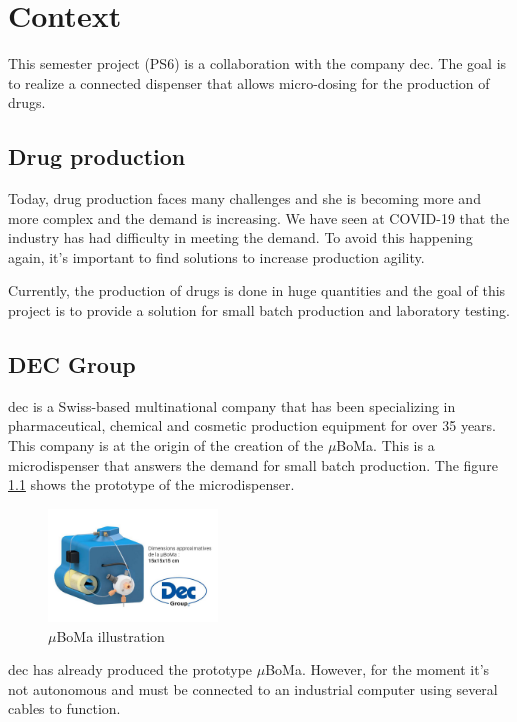 \chapter{Context}
\label{chap:contexte}

This semester project (PS6) is a collaboration with the company \acrfull{dec}.
The goal is to realize a connected dispenser that allows micro-dosing for the production of drugs.


\section{Drug production}
\label{sec:context:production}

Today, drug production faces many challenges and she is becoming more and more complex and the demand is increasing.
We have seen at COVID-19 that the industry has had difficulty in meeting the demand.
To avoid this happening again, it's important to find solutions to increase production agility.

Currently, the production of drugs is done in huge quantities and the goal of this project is to provide a solution for small batch production and laboratory testing.


\section{DEC Group}
\label{sec:context:dec}

\acrfull{dec} is a Swiss-based multinational company that has been specializing in pharmaceutical, chemical and cosmetic production equipment for over 35 years.
This company is at the origin of the creation of the $\mu$BoMa.
This is a microdispenser that answers the demand for small batch production.
The figure \ref{fig:dec} shows the prototype of the microdispenser.

\begin{figure}[ht]
    \centering
    \includegraphics[width=0.4\textwidth]{img/logo.png}
    \caption{$\mu$BoMa illustration}
    \label{fig:dec}
\end{figure}

\acrshort{dec} has already produced the prototype $\mu$BoMa.
However, for the moment it's not autonomous and must be connected to an industrial computer using several cables to function.


